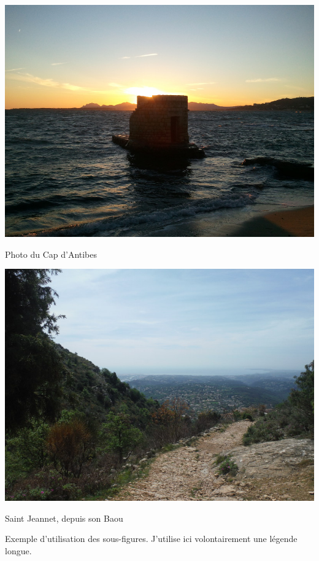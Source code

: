 			\begin{figureth}
				\begin{subfigureth}{0.4\textwidth}
					\includegraphics[width=\linewidth]{Antibes}
					\caption{Photo du Cap d'Antibes}
					\label{sub:Antibes}
				\end{subfigureth}
				\begin{subfigureth}{0.4\textwidth}
					\includegraphics[width=\linewidth]{SaintJeannet}
					\caption{Saint Jeannet, depuis son Baou}
					\label{sub:SaintJeannet}
				\end{subfigureth}
				\caption[Légende courte pour la figure]{Exemple d'utilisation des sous-figures. J'utilise ici volontairement une légende longue.}		
				\label{fig:exemple}
			\end{figureth}
	
